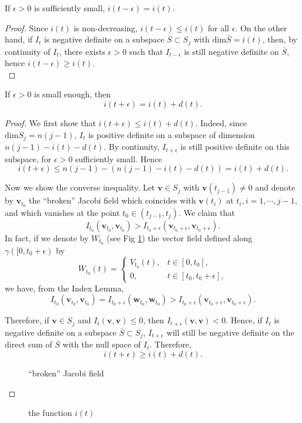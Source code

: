 \begin{lemma}
  If $\epsilon >0$ is sufficiently small, $i(t-\epsilon )=i(t)$.
\end{lemma}
\begin{proof}
  Since $i(t)$ is non-decreasing, $i(t-\epsilon )\le i(t)$ for all $\epsilon $. On the other hand, if $I_t$ is negative definite on a subspace $\overline{S}\subset S_j$ with $\mathrm{dim}\overline{S}=i(t)$, then, by continuity of $I_t$, there exists $\epsilon >0$ such that $I_{t-\epsilon }$ is still negative definite on $\overline{S}$, hence $i(t-\epsilon )\ge i(t)$.\\
\end{proof}

\begin{lemma}
  If $\epsilon >0$ is small enough, then \[
    i(t+\epsilon )=i(t)+d(t).
  \] 
\end{lemma}
\begin{proof}
  We first show that $i(t+\epsilon )\le i(t)+d(t)$. Indeed, since $\mathrm{dim}S_j=n(j-1)$, $I_t$ is positive definite on a subspace of dimension $n(j-1)-i(t)-d(t)$. By continuity, $I_{t+\epsilon }$ is still positive definite on this subspace, for $\epsilon >0$ sufficiently small. Hence
  \[
    i(t+\epsilon )\le n(j-1)-\left( n(j-1)-i(t)-d(t) \right) =i(t)+d(t).
  \] 

  Now we show the converse inequality. Let $\mathbf{v}\in S_j$ with $\mathbf{v}(t_{j-1})\neq 0$ and denote by $\mathbf{v}_{t_0}$ the ``broken'' Jacobi field which coincides with $\mathbf{v}(t_i)$ at $t_i,i=1,\cdots ,j-1$, and which vanishes at the point $t_0\in (t_{j-1},t_j)$.  We claim 
  that 
  \[
    I_{t_0}\left( \mathbf{v}_{t_0},\mathbf{v}_{t_0} \right) >I_{t_0+\epsilon }\left( \mathbf{v}_{t_0+\epsilon },\mathbf{v}_{t_0+\epsilon } \right).
  \]
  In fact, if we denote by $W_{t_0}$ (see Fig \ref{fig:broken-jacobi-field}) the vector field defined along $\gamma\left( [0,t_0+\epsilon  \right) $ by
  \[
    W_{t_0}(t)=\begin{cases}
      V_{t_0}(t), & t\in [0,t_0],\\
      0,& t\in \left[ t_0,t_0+\epsilon  \right], 
    \end{cases}
  \] 
  we have, from the Index Lemma,
  \[
    I_{t_0}\left( \mathbf{v}_{t_0},\mathbf{v}_{t_0} \right) =I_{t_0+\epsilon }\left( \mathbf{w}_{t_0},\mathbf{w}_{t_0} \right) > I_{t_0+\epsilon }\left( \mathbf{v}_{t_0+\epsilon },\mathbf{v}_{t_0+\epsilon } \right) .
  \] 

  Therefore, if $\mathbf{v}\in S_j$ and $I_t(\mathbf{v},\mathbf{v})\le 0$, then $I_{t+\epsilon }(\mathbf{v},\mathbf{v})<0$. Hence, if $I_t$ is negative definite on a subspace $\overline{S}\subset S_j$, $I_{t+\epsilon }$ will still be negative definite on the direct sum of $\overline{S}$ with the null space of $I_t$. Therefore,
  \[
    i(t+\epsilon )\ge i(t)+d(t).
  \] 
\begin{figure}[ht]
    \centering
    \caption{``broken'' Jacobi field}
    \label{fig:broken-jacobi-field}
\end{figure}
\end{proof}
\begin{figure}[ht]
    \centering
    \caption{the function $i(t)$}
    \label{fig:the-function}
\end{figure}
